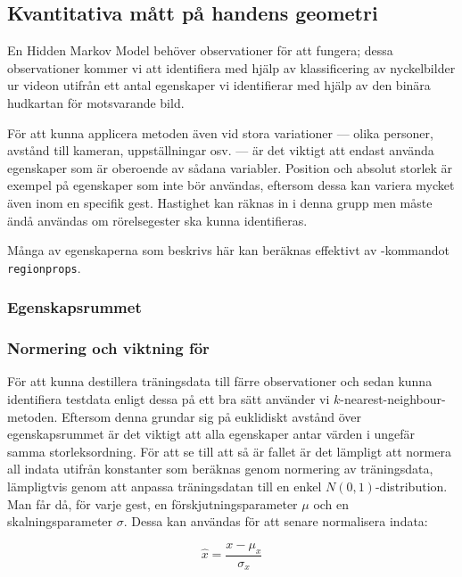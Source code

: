 \documentclass[../rapport_MVEX01-11-05]{subfiles}
\begin{document}
\subsection{Kvantitativa mått på handens geometri}

En Hidden Markov Model behöver observationer för att fungera; dessa
observationer kommer vi att identifiera med hjälp av klassificering av
nyckelbilder ur videon utifrån ett antal egenskaper vi identifierar
med hjälp av den binära hudkartan för motsvarande bild.

För att kunna applicera metoden även vid stora variationer --- olika
personer, avstånd till kameran, uppställningar osv. --- är det viktigt
att endast använda egenskaper som är oberoende av sådana variabler.
Position och absolut storlek är exempel på egenskaper som inte bör
användas, eftersom dessa kan variera mycket även inom en specifik
gest. Hastighet kan räknas in i denna grupp men måste ändå användas
om rörelsegester ska kunna identifieras.

Många av egenskaperna som beskrivs här kan beräknas effektivt av
\MATLAB-kommandot \texttt{regionprops}.

\subsubsection{Egenskapsrummet}

\subsubsection{Normering och viktning för \knn}


För att kunna destillera träningsdata till färre observationer och sedan
kunna identifiera testdata enligt dessa på ett bra sätt använder vi
$k$-nearest-neighbour-metoden. Eftersom denna grundar sig på euklidiskt
avstånd över egenskapsrummet är det viktigt att alla egenskaper antar värden
i ungefär samma storleksordning. För att se till att så är fallet är det
lämpligt att normera all indata utifrån konstanter som beräknas genom
normering av träningsdata, lämpligtvis genom att anpassa träningsdatan till en
enkel $N(0,1)$-distribution. Man får då, för varje gest, en
förskjutningsparameter $\mu$ och en skalningsparameter $\sigma$. Dessa kan
användas för att senare normalisera indata:

\begin{equation*}
	\hat{x} = \frac{x - \mu_x}{\sigma_x}
\end{equation*}
\end{document}
